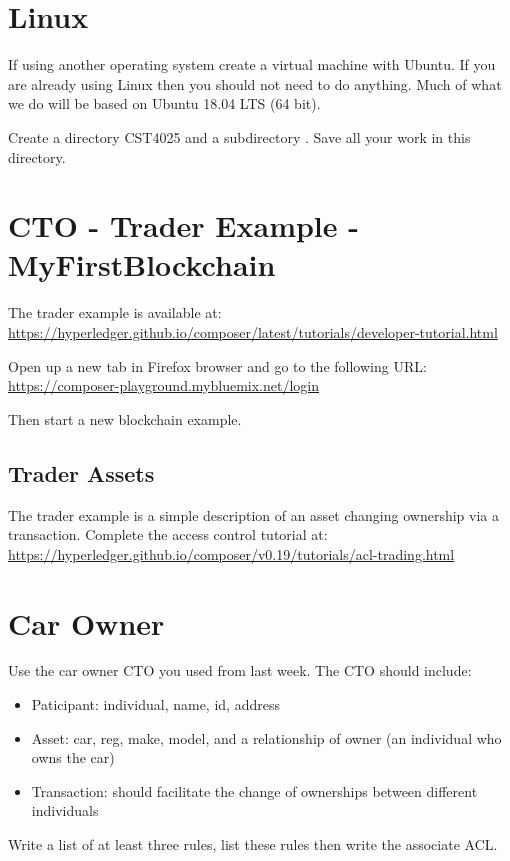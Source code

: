
\section{Linux}
If using another operating system create a virtual machine with Ubuntu. If you are already using Linux then you should not need to do anything. Much of what we do will be based on Ubuntu 18.04 LTS (64 bit).

Create a directory CST4025 and a subdirectory \theweek. Save all your work in this directory. 


\section{CTO - Trader Example - MyFirstBlockchain}
The trader example is available at: \\
\url{https://hyperledger.github.io/composer/latest/tutorials/developer-tutorial.html}

Open up a new tab in Firefox browser and go to the following URL:\\
\url{https://composer-playground.mybluemix.net/login}

Then start a new blockchain example.

\subsection{Trader Assets} 
The trader example is a simple description of an asset changing ownership via a transaction. Complete the access control tutorial at: \\
\url{https://hyperledger.github.io/composer/v0.19/tutorials/acl-trading.html}


\section{Car Owner}
Use the car owner CTO you used from last week. The CTO should include:
\begin{itemize}
	\item Paticipant: individual, name, id, address
	\item Asset: car, reg, make, model, and a relationship of owner (an individual who owns the car)
	\item Transaction: should facilitate the change of ownerships between different individuals
\end{itemize}
Write a list of at least three rules, list these rules then write the associate ACL.


